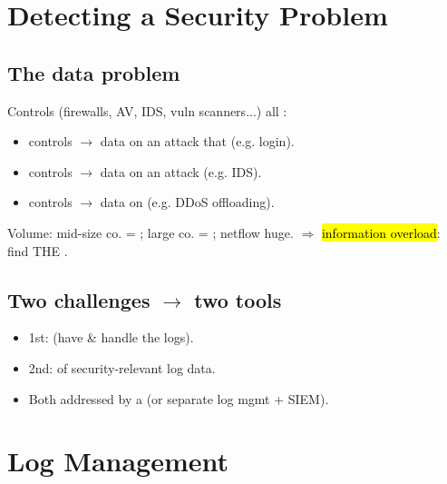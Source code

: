 

\section{Detecting a Security Problem}

\subsection{The data problem}
Controls (firewalls, AV, IDS, vuln scanners...) all :
\begin{itemize}
\item {} controls $\to$ data on an attack that  (e.g. login).
\item {} controls $\to$ data on an attack  (e.g. IDS).
\item {} controls $\to$ data on  (e.g. DDoS offloading).
\end{itemize}
Volume: mid-size co. = ; large co. = ; netflow huge.
$\Rightarrow$ \hl{information overload}: find THE .

\subsection{Two challenges $\to$ two tools}
\begin{itemize}
\item 1st:  (have \& handle the logs).
\item 2nd:  of security-relevant log data.
\item Both addressed by a  (or separate log mgmt + SIEM).
\end{itemize}

\section{Log Management}

